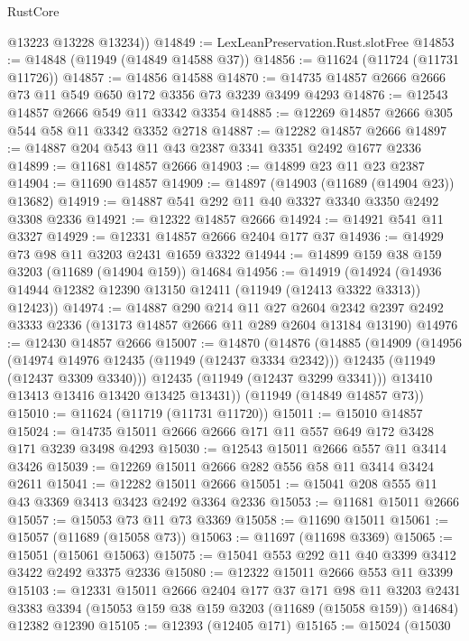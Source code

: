 \begin{lexlean}{RustCore}
\begin{coremodule}
        @13223
        @13228
        @13234))
@14849 := LexLeanPreservation.Rust.slotFree
@14853 := @14848 (@11949 (@14849 @14588 @37))
@14856 := @11624 (@11724 (@11731 @11726))
@14857 := @14856 @14588
@14870 := @14735 @14857 @2666 @2666 @73 @11 @549 @650 @172 @3356 @73 @3239 @3499 @4293
@14876 := @12543 @14857 @2666 @549 @11 @3342 @3354
@14885 := @12269 @14857 @2666 @305 @544 @58 @11 @3342 @3352 @2718
@14887 := @12282 @14857 @2666
@14897 := @14887 @204 @543 @11 @43 @2387 @3341 @3351 @2492 @1677 @2336
@14899 := @11681 @14857 @2666
@14903 := @14899 @23 @11 @23 @2387
@14904 := @11690 @14857
@14909 := @14897 (@14903 (@11689 (@14904 @23)) @13682)
@14919 := @14887 @541 @292 @11 @40 @3327 @3340 @3350 @2492 @3308 @2336
@14921 := @12322 @14857 @2666
@14924 := @14921 @541 @11 @3327
@14929 := @12331 @14857 @2666 @2404 @177 @37
@14936 := @14929 @73 @98 @11 @3203 @2431 @1659 @3322
@14944 := @14899 @159 @38 @159 @3203 (@11689 (@14904 @159)) @14684
@14956 := @14919
    (@14924 (@14936 @14944 @12382 @12390 @13150 @12411 (@11949 (@12413 @3322 @3313)) @12423))
@14974 := @14887
    @290
    @214
    @11
    @27
    @2604
    @2342
    @2397
    @2492
    @3333
    @2336
    (@13173 @14857 @2666 @11 @289 @2604 @13184 @13190)
@14976 := @12430 @14857 @2666
@15007 := @14870
    (@14876
      (@14885
        (@14909
          (@14956
            (@14974 @14976 @12435 (@11949 (@12437 @3334 @2342)))
            @12435
            (@11949 (@12437 @3309 @3340)))
          @12435
          (@11949 (@12437 @3299 @3341)))
        @13410
        @13413
        @13416
        @13420
        @13425
        @13431))
    (@11949 (@14849 @14857 @73))
@15010 := @11624 (@11719 (@11731 @11720))
@15011 := @15010 @14857
@15024 := @14735 @15011 @2666 @2666 @171 @11 @557 @649 @172 @3428 @171 @3239 @3498 @4293
@15030 := @12543 @15011 @2666 @557 @11 @3414 @3426
@15039 := @12269 @15011 @2666 @282 @556 @58 @11 @3414 @3424 @2611
@15041 := @12282 @15011 @2666
@15051 := @15041 @208 @555 @11 @43 @3369 @3413 @3423 @2492 @3364 @2336
@15053 := @11681 @15011 @2666
@15057 := @15053 @73 @11 @73 @3369
@15058 := @11690 @15011
@15061 := @15057 (@11689 (@15058 @73))
@15063 := @11697 (@11698 @3369)
@15065 := @15051 (@15061 @15063)
@15075 := @15041 @553 @292 @11 @40 @3399 @3412 @3422 @2492 @3375 @2336
@15080 := @12322 @15011 @2666 @553 @11 @3399
@15103 := @12331
    @15011
    @2666
    @2404
    @177
    @37
    @171
    @98
    @11
    @3203
    @2431
    @3383
    @3394
    (@15053 @159 @38 @159 @3203 (@11689 (@15058 @159)) @14684)
    @12382
    @12390
@15105 := @12393 (@12405 @171)
@15165 := @15024
    (@15030

\end{coremodule}
\end{lexlean}
